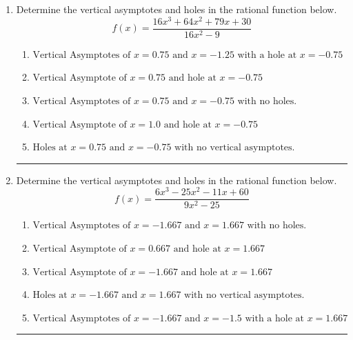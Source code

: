 \documentclass[14pt]{extbook}
\newcommand{\litem}[1]{\item#1\hspace*{-1cm}\rule{\textwidth}{0.4pt}}
\begin{document}
\begin{enumerate}
{\begin{enumerate}[label=\Alph*.]
\end{enumerate} }
\litem{
Determine the vertical asymptotes and holes in the rational function below.\[ f(x) = \frac{16x^{3} +64 x^{2} +79 x + 30}{16x^{2} -9} \]\begin{enumerate}[label=\Alph*.]
\item \( \text{Vertical Asymptotes of } x = 0.75 \text{ and } x = -1.25 \text{ with a hole at } x = -0.75 \)
\item \( \text{Vertical Asymptote of } x = 0.75 \text{ and hole at } x = -0.75 \)
\item \( \text{Vertical Asymptotes of } x = 0.75 \text{ and } x = -0.75 \text{ with no holes.} \)
\item \( \text{Vertical Asymptote of } x = 1.0 \text{ and hole at } x = -0.75 \)
\item \( \text{Holes at } x = 0.75 \text{ and } x = -0.75 \text{ with no vertical asymptotes.} \)

\end{enumerate} }
\litem{
Determine the vertical asymptotes and holes in the rational function below.\[ f(x) = \frac{6x^{3} -25 x^{2} -11 x + 60}{9x^{2} -25} \]\begin{enumerate}[label=\Alph*.]
\item \( \text{Vertical Asymptotes of } x = -1.667 \text{ and } x = 1.667 \text{ with no holes.} \)
\item \( \text{Vertical Asymptote of } x = 0.667 \text{ and hole at } x = 1.667 \)
\item \( \text{Vertical Asymptote of } x = -1.667 \text{ and hole at } x = 1.667 \)
\item \( \text{Holes at } x = -1.667 \text{ and } x = 1.667 \text{ with no vertical asymptotes.} \)
\item \( \text{Vertical Asymptotes of } x = -1.667 \text{ and } x = -1.5 \text{ with a hole at } x = 1.667 \)

\end{enumerate} }
\end{enumerate}
\end{document}
